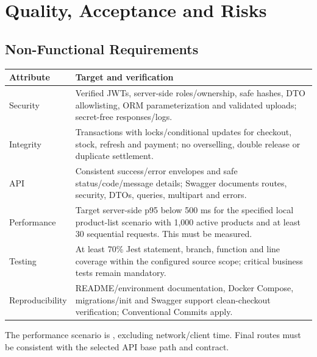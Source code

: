\chapter{Quality, Acceptance and Risks}
\section{Non-Functional Requirements}
\begin{tabularx}{\textwidth}{@{}p{30mm}X@{}}
\toprule
Attribute & Target and verification \\
\midrule
Security & Verified JWTs, server-side roles/ownership, safe hashes, DTO allowlisting, ORM parameterization and validated uploads; secret-free responses/logs. \\
Integrity & Transactions with locks/conditional updates for checkout, stock, refresh and payment; no overselling, double release or duplicate settlement. \\
API & Consistent success/error envelopes and safe status/code/message details; Swagger documents routes, security, DTOs, queries, multipart and errors. \\
Performance & Target server-side p95 below 500 ms for the specified local product-list scenario with 1,000 active products and at least 30 sequential requests. This must be measured. \\
Testing & At least 70\% Jest statement, branch, function and line coverage within the configured source scope; critical business tests remain mandatory. \\
Reproducibility & README/environment documentation, Docker Compose, migrations/init and Swagger support clean-checkout verification; Conventional Commits apply. \\
\bottomrule
\end{tabularx}

The performance scenario is , excluding network/client time. Final routes must be consistent with the selected API base path and contract.

